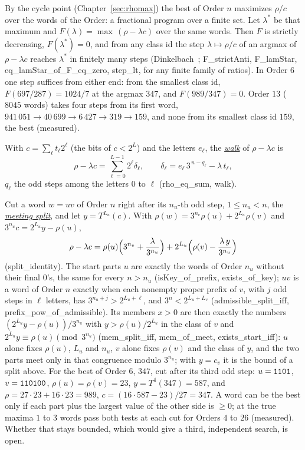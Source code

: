 \documentclass[10pt,a4paper,titlepage]{article}
\makeatletter
\newcommand{\termhere}[1]{\leavevmode
  \Hy@raisedlink{\hyper@anchorstart{term:#1}\hyper@anchorend}}
\newcommand{\keyterm}[2]{\hyperlink{box:#1}{\emph{#2}}}
\newcommand{\keysym}[2]{\hyperlink{box:#1}{#2}}
\newcommand{\lean}[1]{\textsf{#1}}
\makeatother
\begin{document}
By the cycle point (Chapter~\ref{sec:rhomax}) the best of Order $n$ maximizes $\rho/c$ over the words
of the Order: a fractional program over a finite set. \termhere{lambdastar}Let
\keysym{lambdastar}{$\lambda^\ast$} be that maximum and $F(\lambda) = \max\,(\rho - \lambda c)$ over
the same words. Then $F$ is strictly decreasing, $F(\lambda^\ast) = 0$, and from any class id the
step $\lambda \mapsto \rho/c$ of an argmax of $\rho - \lambda c$ reaches $\lambda^\ast$ in finitely
many steps (Dinkelbach~\cite{Dinkelbach1967}; \lean{F\_strictAnti}, \lean{F\_lamStar},
\lean{eq\_lamStar\_of\_F\_eq\_zero}, \lean{step\_lt}, for any finite family of ratios). In Order $6$
one step suffices from either end: from the smallest class id, $F(697/287) = 1024/7$ at the argmax
$347$, and $F(989/347) = 0$. Order $13$ ($8045$ words) takes four steps from its first word,
$941\,051 \to 40\,699 \to 6\,427 \to 319 \to 159$, and none from its smallest class id $159$, the best
(measured).

\termhere{walk}With $c = \sum_\ell t_\ell 2^\ell$ (the bits of $c < 2^L$) and the letters $e_\ell$, the
\keyterm{walk}{walk} of $\rho - \lambda c$ is
\[
\rho - \lambda c = \sum_{\ell=0}^{L-1} 2^\ell \delta_\ell,\qquad
\delta_\ell = e_\ell\,3^{\,n-q_\ell} - \lambda\,t_\ell,
\]
$q_\ell$ the odd steps among the letters $0$ to $\ell$ (\lean{rho\_eq\_sum}, \lean{walk}).

\termhere{meetingsplit}Cut a word $w = uv$ of Order $n$ right after its $n_u$-th odd step, $1 \le n_u < n$,
the \keyterm{meetingsplit}{meeting split}, and let $y = T^{L_u}(c)$. With $\rho(w) = 3^{n_v}\rho(u)
+ 2^{L_u}\rho(v)$ and $3^{n_u} c = 2^{L_u} y - \rho(u)$,
\[
\rho - \lambda c = \rho(u)\Bigl(3^{n_v} + \frac{\lambda}{3^{n_u}}\Bigr)
  + 2^{L_u}\Bigl(\rho(v) - \frac{\lambda\,y}{3^{n_u}}\Bigr)
\]
(\lean{split\_identity}). The start parts $u$ are exactly the words of Order $n_u$ without their
final $0$'s, the same for every $n > n_u$ (\lean{isKey\_of\_prefix}, \lean{exists\_of\_key}); $uv$ is
a word of Order $n$ exactly when each nonempty proper prefix of $v$, with $j$ odd steps in $\ell$
letters, has $3^{n_u + j} > 2^{L_u + \ell}$, and $3^n < 2^{L_u + L_v}$
(\lean{admissible\_split\_iff}, \lean{prefix\_pow\_of\_admissible}). Its members $x > 0$ are then
exactly the numbers $(2^{L_u} y - \rho(u))/3^{n_u}$ with $y > \rho(u)/2^{L_u}$ in the class of $v$ and
$2^{L_u} y \equiv \rho(u) \pmod{3^{n_u}}$ (\lean{mem\_split\_iff}, \lean{mem\_of\_meet},
\lean{exists\_start\_iff}): $u$ alone fixes $\rho(u)$, $L_u$ and $n_u$, $v$ alone fixes $\rho(v)$
and the class of $y$, and the two parts meet only in that congruence modulo $3^{n_u}$; with
$y = c_v$ it is the bound of a split above. For the best of Order $6$, $347$, cut after its third odd
step: $u = \text{\texttt{1101}}$, $v = \text{\texttt{110100}}$, $\rho(u) = \rho(v) = 23$, $y = T^4(347) = 587$, and
$\rho = 27 \cdot 23 + 16 \cdot 23 = 989$, $c = (16 \cdot 587 - 23)/27 = 347$. A word can be the best only
if each part plus the largest value of the other side is $\ge 0$; at the true maxima $1$ to $3$ words
pass both tests at each cut for Orders $4$ to $26$ (measured). Whether that stays bounded, which
would give a third, independent search, is open.
\end{document}
